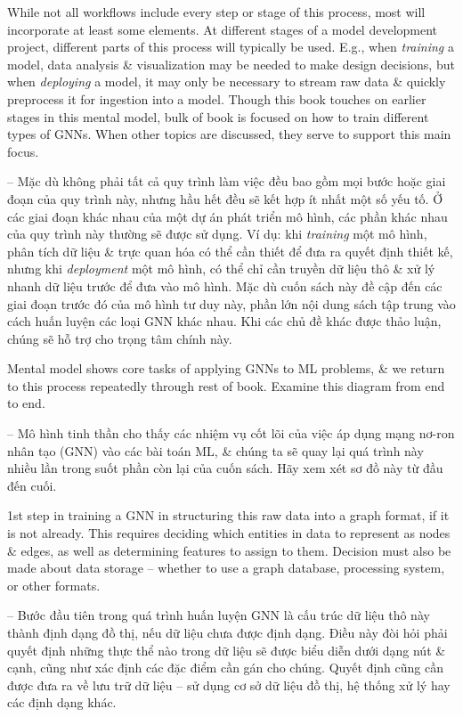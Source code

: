 \documentclass{article}
\begin{document}
\begin{itemize}
\begin{itemize}
\begin{itemize}
            While not all workflows include every step or stage of this process, most will incorporate at least some elements. At different stages of a model development project, different parts of this process will typically be used. E.g., when {\it training} a model, data analysis \& visualization may be needed to make design decisions, but when {\it deploying} a model, it may only be necessary to stream raw data \& quickly preprocess it for ingestion into a model. Though this book touches on earlier stages in this mental model, bulk of book is focused on how to train different types of GNNs. When other topics are discussed, they serve to support this main focus.

            -- Mặc dù không phải tất cả quy trình làm việc đều bao gồm mọi bước hoặc giai đoạn của quy trình này, nhưng hầu hết đều sẽ kết hợp ít nhất một số yếu tố. Ở các giai đoạn khác nhau của một dự án phát triển mô hình, các phần khác nhau của quy trình này thường sẽ được sử dụng. Ví dụ: khi {\it training} một mô hình, phân tích dữ liệu \& trực quan hóa có thể cần thiết để đưa ra quyết định thiết kế, nhưng khi {\it deployment} một mô hình, có thể chỉ cần truyền dữ liệu thô \& xử lý nhanh dữ liệu trước để đưa vào mô hình. Mặc dù cuốn sách này đề cập đến các giai đoạn trước đó của mô hình tư duy này, phần lớn nội dung sách tập trung vào cách huấn luyện các loại GNN khác nhau. Khi các chủ đề khác được thảo luận, chúng sẽ hỗ trợ cho trọng tâm chính này.

            Mental model shows core tasks of applying GNNs to ML problems, \& we return to this process repeatedly through rest of book. Examine this diagram from end to end.

            -- Mô hình tinh thần cho thấy các nhiệm vụ cốt lõi của việc áp dụng mạng nơ-ron nhân tạo (GNN) vào các bài toán ML, \& chúng ta sẽ quay lại quá trình này nhiều lần trong suốt phần còn lại của cuốn sách. Hãy xem xét sơ đồ này từ đầu đến cuối.

            1st step in training a GNN in structuring this raw data into a graph format, if it is not already. This requires deciding which entities in data to represent as nodes \& edges, as well as determining features to assign to them. Decision must also be made about data storage -- whether to use a graph database, processing system, or other formats.

            -- Bước đầu tiên trong quá trình huấn luyện GNN là cấu trúc dữ liệu thô này thành định dạng đồ thị, nếu dữ liệu chưa được định dạng. Điều này đòi hỏi phải quyết định những thực thể nào trong dữ liệu sẽ được biểu diễn dưới dạng nút \& cạnh, cũng như xác định các đặc điểm cần gán cho chúng. Quyết định cũng cần được đưa ra về lưu trữ dữ liệu -- sử dụng cơ sở dữ liệu đồ thị, hệ thống xử lý hay các định dạng khác.


\end{itemize}
\end{itemize}
\end{itemize}
\end{document}
